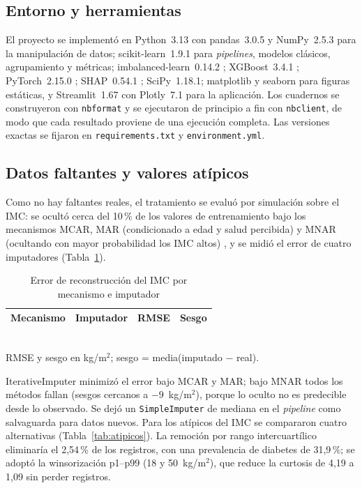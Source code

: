 \documentclass[conference,a4paper]{IEEEtran}
\begin{document}
\subsection{Entorno y herramientas}
El proyecto se implementó en Python~3.13 con pandas~3.0.5 y NumPy~2.5.3 para la manipulación de datos; scikit-learn~1.9.1 \citep{pedregosa2011} para \textit{pipelines}, modelos clásicos, agrupamiento y métricas; imbalanced-learn~0.14.2 \citep{lemaitre2017}; XGBoost~3.4.1 \citep{chen2016}; PyTorch~2.15.0 \citep{paszke2019}; SHAP~0.54.1 \citep{lundberg2017}; SciPy~1.18.1; matplotlib y seaborn para figuras estáticas, y Streamlit~1.67 con Plotly~7.1 para la aplicación. Los cuadernos se construyeron con \texttt{nbformat} y se ejecutaron de principio a fin con \texttt{nbclient}, de modo que cada resultado proviene de una ejecución completa. Las versiones exactas se fijaron en \texttt{requirements.txt} y \texttt{environment.yml}.

\subsection{Datos faltantes y valores atípicos}
Como no hay faltantes reales, el tratamiento se evaluó por simulación sobre el IMC: se ocultó cerca del 10\,\% de los valores de entrenamiento bajo los mecanismos MCAR, MAR (condicionado a edad y salud percibida) y MNAR (ocultando con mayor probabilidad los IMC altos) \citep{little2019}, y se midió el error de cuatro imputadores (Tabla~\ref{tab:imputacion}).

\begin{table}[!t]
\centering
\caption{Error de reconstrucción del IMC por mecanismo e imputador}
\label{tab:imputacion}
\scriptsize
\begin{tabular}{@{}llrr@{}}
\toprule
\textbf{Mecanismo} & \textbf{Imputador} & \textbf{RMSE} & \textbf{Sesgo} \\
\midrule

\end{tabular}\\[2pt]
{\footnotesize RMSE y sesgo en kg/m$^2$; sesgo = media(imputado $-$ real).}
\end{table}

IterativeImputer minimizó el error bajo MCAR y MAR; bajo MNAR todos los métodos fallan (sesgos cercanos a $-9$~kg/m$^2$), porque lo oculto no es predecible desde lo observado. Se dejó un \texttt{SimpleImputer} de mediana en el \textit{pipeline} como salvaguarda para datos nuevos. Para los atípicos del IMC se compararon cuatro alternativas (Tabla~\ref{tab:atipicos}). La remoción por rango intercuartílico eliminaría el 2,54\,\% de los registros, con una prevalencia de diabetes de 31,9\,\%; se adoptó la winsorización p1--p99 (18 y 50~kg/m$^2$), que reduce la curtosis de 4,19 a 1,09 sin perder registros.
\end{document}
